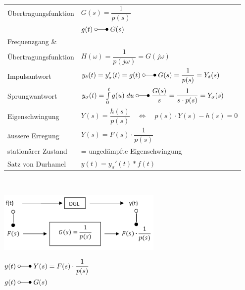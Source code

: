 			\begin{minipage}{12cm}

				\renewcommand{\arraystretch}{2}
					\begin{tabular}{| l | l |}		%
						\hline
							Übertragungsfunktion & $G(s) = \dfrac{1}{p(s)}$\\
							& $g(t) \; \laplace \; G(s)$ \\
						\hline
							Frequenzgang \& \\ Übertragungsfunktion  & $H(\omega) = \dfrac{1}{p(j\omega)} = G(j\omega) $ \\
						\hline
							Impulsantwort & $y_{\delta}(t) = y_{\sigma}'(t) = g(t) \; \laplace \; G(s) = \dfrac{1}{p(s)}=Y_{\delta}(s)$\\
						\hline
							Sprungwantwort & $y_{\sigma}(t)=\int\limits_0^t g(u) \; du \; \laplace \; \dfrac{G(s)}{s} = \dfrac{1}{s \cdot p(s)} = Y_{\sigma}(s)$\\
						\hline
							Eigenschwingung & $Y(s) = \dfrac{h(s)}{p(s)} \quad \iff \quad p(s) \cdot Y(s)-h(s) = 0$ \\
						\hline
							äussere Erregung & $ Y(s) = F(s) \cdot \dfrac{1}{p(s)}$ \\
						\hline
							stationärer Zustand & = ungedämpfte Eigenschwingung\\
						\hline
						\hline
							Satz von Durhamel & $y(t) = y_{\sigma}'(t) * f(t)$\\
						\hline
					\end{tabular}
				\renewcommand{\arraystretch}{\arraystretchOriginal}\\
			
			\end{minipage}
			\begin{minipage}[b]{8cm}
				\includegraphics[width=8cm]{./bilder/diffgleichungen2.png} \\[7mm]

					\hspace{3cm}\begin{minipage}{4cm}
						$
						\begin{aligned}
							y(t) \; &\laplace \; Y(s) = F(s) \cdot \dfrac{1}{p(s)}\\
							g(t) \; &\laplace \; G(s) \\
						\end{aligned}
						$
					\end{minipage}	
			\end{minipage}

